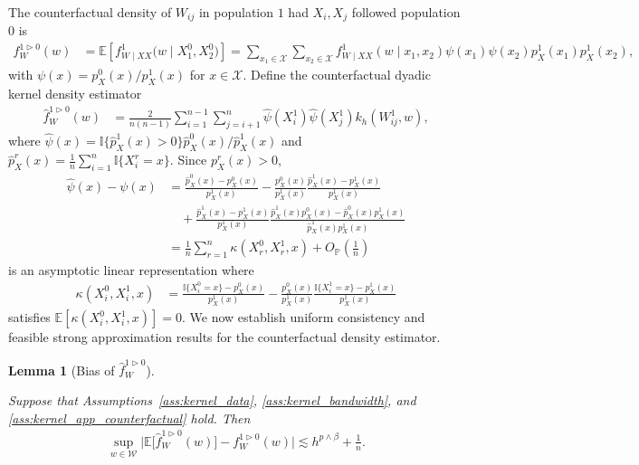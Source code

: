 \documentclass[11pt,lof]{puthesis}
\renewcommand{\P}{\ensuremath{\mathbb{P}}}
\newcommand{\E}{\ensuremath{\mathbb{E}}}
\newcommand{\I}{\ensuremath{\mathbb{I}}}
\newcommand{\cX}{\ensuremath{\mathcal{X}}}
\newcommand{\cW}{\ensuremath{\mathcal{W}}}
\theoremstyle{break}
\newtheorem{lemma}{Lemma}[section]
\theoremstyle{proof}
\begin{document}
The counterfactual density of $W_{i j}$ in population $1$ had $X_i, X_j$
followed population $0$ is
%
\begin{align*}
  f_W^{1 \triangleright 0}(w)
  &=
  \E\left[
    f_{W \mid XX}^1\big(w \mid X_1^0, X_2^0\big)
  \right]
  = \sum_{x_1 \in \cX}
  \sum_{x_2 \in \cX}
  f_{W \mid XX}^{1}(w \mid x_1, x_2)
  \psi(x_1)
  \psi(x_2)
  p_X^{1}(x_1)
  p_X^{1}(x_2),
\end{align*}
%
with $\psi(x) = p_X^0(x)/p_X^1(x)$ for $x \in \cX$.
Define the counterfactual dyadic kernel density estimator
%
\begin{align*}
  \hat f_W^{1 \triangleright 0}(w)
  &=
  \frac{2}{n(n-1)}
  \sum_{i=1}^{n-1}
  \sum_{j=i+1}^n
  \hat \psi(X_i^1)
  \hat \psi(X_j^1)
  k_h(W_{i j}^1, w),
\end{align*}
%
where
$\hat\psi(x) = \I\{\hat p_X^{1}(x) > 0\}\hat p_X^{0}(x) / \hat p_X^{1}(x)$
and $\hat p_X^{r}(x) = \frac{1}{n}\sum_{i = 1}^n \I\{X_i^r = x\}$.
Since $p_X^r(x) > 0$,
%
\begin{align*}
  \hat\psi(x) - \psi(x)
  &=
  \frac{\hat p_X^{0}(x) - p_X^0(x)}{p_X^1(x)}
  - \frac{p_X^0(x)}{p_X^1(x)}
  \frac{\hat p_X^{1}(x) - p_X^1(x)}{p_X^1(x)} \\
  &\quad+
  \frac{\hat p_X^{1}(x) - p_X^1(x)}{p_X^1(x)}
  \frac{\hat p_X^{1}(x) p_X^0(x) - \hat p_X^{0}(x)p_X^1(x)}
  {\hat p_X^{1}(x) p_X^1(x)} \\
  &=
  \frac{1}{n}
  \sum_{r=1}^n \kappa(X_r^0, X_r^1, x)
  + O_\P\left(\frac{1}{n}\right)
\end{align*}
%
is an asymptotic linear representation where
%
\begin{align*}
  \kappa(X_i^0, X_i^1, x)
  &=
  \frac{\I\{X_i^0 = x\} - p_X^0(x)}{p_X^1(x)}
  - \frac{p_X^0(x)}{p_X^1(x)}
  \frac{\I\{X_i^1 = x\} - p_X^1(x)}{p_X^1(x)}
\end{align*}
%
satisfies
$\E[\kappa(X_i^0, X_i^1, x)] = 0$.
We now establish uniform consistency and feasible strong
approximation results for the counterfactual density estimator.

\begin{lemma}[Bias of $\hat f_W^{1 \triangleright 0}$]
  \label{lem:kernel_app_counterfactual_bias}

  Suppose that Assumptions~\ref{ass:kernel_data},
  \ref{ass:kernel_bandwidth}, and \ref{ass:kernel_app_counterfactual} hold.
  Then
  \begin{align*}
    \sup_{w \in \cW}
    \big|
    \E\big[\hat f_W^{1 \triangleright 0}(w)\big]
    - f_W^{1 \triangleright 0}(w)
    \big|
    \lesssim
    h^{p \wedge \beta} + \frac{1}{n}.
  \end{align*}

\end{lemma}
\end{document}
